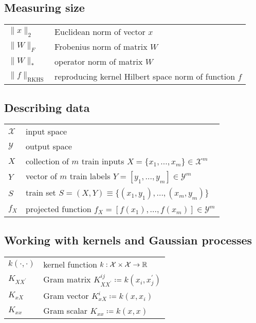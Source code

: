 
\subsection*{Measuring size}

\bgroup
\def\arraystretch{1.5}
\begin{tabular}{p{1in}p{4in}}
$\displaystyle \|x\|_2$ & Euclidean norm of vector $x$\\
$\displaystyle \|W\|_F$ & Frobenius norm of matrix $W$\\
$\displaystyle \|W\|_*$ & operator norm of matrix $W$\\
$\displaystyle \|f\|_\mathrm{RKHS}$ & reproducing kernel Hilbert space norm of function $f$\\
\end{tabular}
\egroup
\vspace{0.5em}

\subsection*{Describing data}
\bgroup
\def\arraystretch{1.5}
\begin{tabular}{p{1in}p{4in}}
$\displaystyle \mathcal{X}$ & input space\\
$\displaystyle \mathcal{Y}$ &
output space\\
$\displaystyle X$ & collection of $m$ train inputs $X=\{x_1,...,x_m\}\in\mathcal{X}^m$\\
$\displaystyle Y$ & vector of $m$ train labels $Y=[y_1,...,y_m]\in\mathcal{Y}^m$\\
$\displaystyle S$ & train set $S = (X,Y) \equiv \{(x_1,y_1),...,(x_m,y_m)\}$\\
$\displaystyle f_X$ & projected function $f_X = [f(x_1),...,f(x_m)]\in\mathcal{Y}^m$\\
\end{tabular}
\egroup
\vspace{0.5em}

\subsection*{Working with kernels and Gaussian processes}
\bgroup
\def\arraystretch{1.5}
\begin{tabular}{p{1in}p{4in}}
$\displaystyle k(\cdot,\cdot)$ & kernel function $k:\mathcal{X}\times\mathcal{X}\to\mathbb{R}$\\
$\displaystyle K_{XX^\prime}$ & Gram matrix $K_{XX^\prime}^{ij} \coloneqq k(x_i,x^\prime_j)$\\
$\displaystyle K_{xX}$ & Gram vector $K_{xX}^{i} \coloneqq k(x,x_i)$\\
$\displaystyle K_{xx}$ & Gram scalar $K_{xx} \coloneqq k(x,x)$\\
\end{tabular}
\egroup
\vspace{0.5em}

